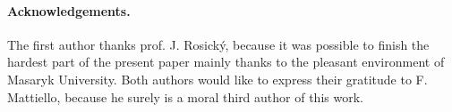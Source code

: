 \medskip
\paragraph{\bf Acknowledgements.} The first author thanks prof\@. J\@. Rosick\'y, because it was possible to finish the hardest part of the present paper mainly thanks to the pleasant environment of Masaryk University.
Both authors would like to express their gratitude to F\@. Mattiello, because he surely is a moral third author of this work.%


